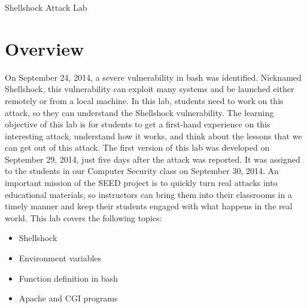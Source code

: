 
\newcommand{\commonfolder}{../../common-files}
\newcommand{\webcommon}{../Web_Common}





\newcommand{\bash}{{\tt bash}\xspace}
\newcommand{\Bash}{{\tt Bash}\xspace}




\begin{center}
{\LARGE Shellshock Attack Lab}
\end{center}


\section{Overview}

On September 24, 2014, a severe vulnerability in bash was identified.
Nicknamed Shellshock, this vulnerability can exploit many systems and be
launched either remotely or from a local machine.  In this
lab, students need to work on this attack, so they can understand the
Shellshock vulnerability. The learning objective of this lab is for students to get a
first-hand experience on this interesting attack, understand how it
works, and think about the lessons that we can get out of this
attack. The first version of this lab was developed on September 29, 2014, 
just five days after the attack was reported. It was assigned to the students 
in our Computer Security class on September 30, 2014. An important mission
of the SEED project is to quickly turn real attacks 
into educational materials, so instructors can bring them into their
classrooms in a timely manner and keep their students engaged with what
happens in the real world. This lab covers the following topics:

\begin{itemize}[noitemsep]
\item Shellshock
\item Environment variables 
\item Function definition in bash
\item Apache and CGI programs
\end{itemize}


